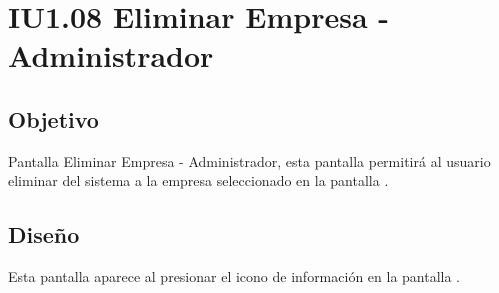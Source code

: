 \newpage
\section{IU1.08 Eliminar Empresa - Administrador}

\subsection{Objetivo}
	Pantalla  Eliminar Empresa - Administrador, esta pantalla permitirá al usuario  eliminar del sistema a la empresa seleccionado en la pantalla .
	
	


\subsection{Diseño}
    Esta pantalla aparece al presionar el icono de información \faTrashO en la pantalla .

	
